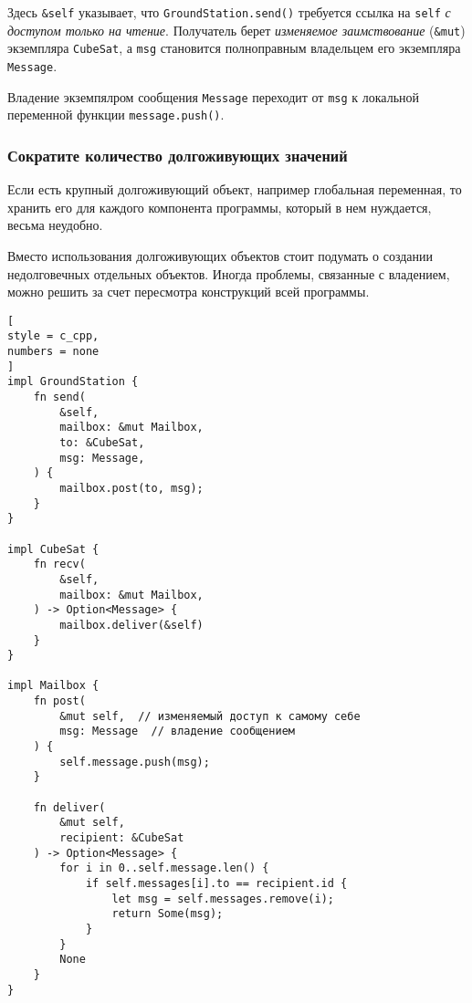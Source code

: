 \documentclass[%
	11pt,
	a4paper,
	utf8,
		]{article}
\begin{document}
Здесь \verb|&self| указывает, что \verb|GroundStation.send()| требуется ссылка на \verb|self| \emph{с доступом только на чтение}. Получатель берет \emph{изменяемое заимствование} (\verb|&mut|) экземпляра \verb|CubeSat|, а \verb|msg| становится полноправным владельцем его экземпляра \verb|Message|.

Владение экземпялром сообщения \verb|Message| переходит от \verb|msg| к локальной переменной функции \verb|message.push()|.

\subsubsection{Сократите количество долгоживующих значений}

Если есть крупный долгоживующий объект, например глобальная переменная, то хранить его для каждого компонента программы, который в нем нуждается, весьма неудобно.

Вместо использования долгоживующих объектов стоит подумать о создании недолговечных отдельных объектов. Иногда проблемы, связанные с владением, можно решить за счет пересмотра конструкций всей программы.

\begin{lstlisting}[
style = c_cpp,
numbers = none
]
impl GroundStation {
    fn send(
        &self,
        mailbox: &mut Mailbox,
        to: &CubeSat,
        msg: Message,
    ) {
        mailbox.post(to, msg);
    }
}

impl CubeSat {
    fn recv(
        &self,
        mailbox: &mut Mailbox,
    ) -> Option<Message> {
        mailbox.deliver(&self)
    }
}

impl Mailbox {
    fn post(
        &mut self,  // изменяемый доступ к самому себе
        msg: Message  // владение сообщением
    ) {
        self.message.push(msg);
    }

    fn deliver(
        &mut self,
        recipient: &CubeSat
    ) -> Option<Message> {
        for i in 0..self.message.len() {
            if self.messages[i].to == recipient.id {
                let msg = self.messages.remove(i);
                return Some(msg);
            }
        }
        None
    }
}
\end{lstlisting}
\end{document}
